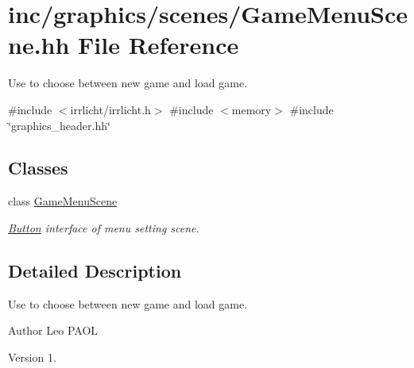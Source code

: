 \hypertarget{GameMenuScene_8hh}{}\section{inc/graphics/scenes/\+Game\+Menu\+Scene.hh File Reference}
\label{GameMenuScene_8hh}


Use to choose between new game and load game.  


{\ttfamily \#include $<$irrlicht/irrlicht.\+h$>$}\newline
{\ttfamily \#include $<$memory$>$}\newline
{\ttfamily \#include \char`\"{}graphics\+\_\+header.\+hh\char`\"{}}\newline
\subsection*{Classes}
\begin{DoxyCompactItemize}
\item 
class \hyperlink{classGameMenuScene}{Game\+Menu\+Scene}
\begin{DoxyCompactList}\small\item\em \hyperlink{classButton}{Button} interface of menu setting scene. \end{DoxyCompactList}\end{DoxyCompactItemize}


\subsection{Detailed Description}
Use to choose between new game and load game. 

\begin{DoxyAuthor}{Author}
Leo P\+A\+OL 
\end{DoxyAuthor}
\begin{DoxyVersion}{Version}
1. 
\end{DoxyVersion}
